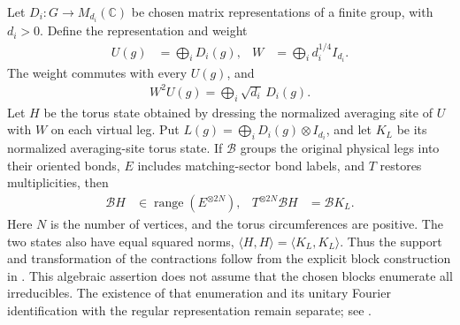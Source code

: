 \begin{lemma}%
    \label{thm:peps_torus_block_multiplicity_state}
    \leanok
    Let $D_i:G\to M_{d_i}(\mathbb C)$ be chosen matrix representations of a
    finite group, with $d_i>0$. Define the representation and weight
    \begin{align}
        U(g) & =\bigoplus_iD_i(g),            &
        W    & =\bigoplus_i d_i^{1/4}I_{d_i}.
    \end{align}
    The weight commutes with every $U(g)$, and
    \begin{align}
        W^2U(g)=\bigoplus_i\sqrt{d_i}\,D_i(g).
    \end{align}
    Let $H$ be the torus state obtained by dressing the normalized
    averaging site of $U$ with $W$ on each virtual leg. Put
    $L(g)=\bigoplus_iD_i(g)\otimes I_{d_i}$, and let $K_L$ be its
    normalized averaging-site torus state. If $\mathcal B$ groups the original
    physical legs into their oriented bonds, $E$ includes matching-sector
    bond labels, and $T$ restores multiplicities, then
    \begin{align}
        \mathcal B H               & \in\operatorname{range}(E^{\otimes 2N}), &
        T^{\otimes 2N}\mathcal B H & =\mathcal B K_L.
    \end{align}
    Here $N$ is the number of vertices, and the torus circumferences are positive.
    The two states also have equal squared norms,
    $\langle H,H\rangle=\langle K_L,K_L\rangle$.
    Thus the support and transformation of the contractions follow
    from the explicit block construction in \cite[Section~7]{Schuch2010PEPS}.
    This algebraic assertion does not assume that the chosen blocks enumerate
    all irreducibles. The existence of that enumeration and its unitary Fourier
    identification with the regular representation remain separate; see
    \cite{gap:rmp_peps_quantum_double_g_isometry}.
\end{lemma}

